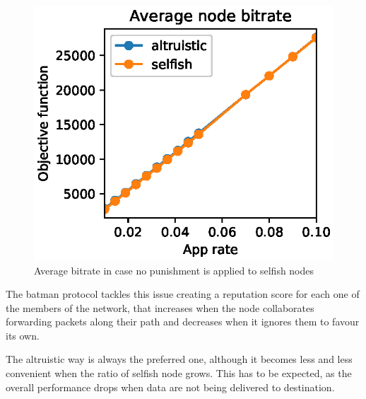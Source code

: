 \documentclass[conference,10.5pt]{IEEEtran}
\begin{document}
\begin{figure}[h]
  \includegraphics{figures/obj_func_vs_app_rate_no_punish.eps}
  \caption{Average bitrate in case no punishment is applied to selfish nodes}
  \label{fig:no-blame-app-rate}
\end{figure}

The \gls{batman} protocol tackles this issue creating a reputation score for each one of the members of the network, that increases when the node collaborates forwarding packets along their path and decreases when it ignores them to favour its own.

The altruistic way is always the preferred one, although it becomes less and less convenient when the ratio of selfish node grows. This has to be expected, as the overall performance drops when data are not being delivered to destination.
\end{document}
